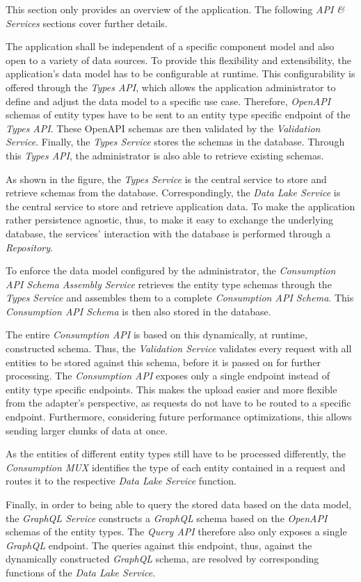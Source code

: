 This section only provides an overview of the application. The following \emph{API \& Services} sections cover further details.\par
The application shall be independent of a specific component model and also open to a variety of data sources. To provide this flexibility and extensibility, the application's data model has to be configurable at runtime. This configurability is offered through the \emph{Types API}, which allows the application administrator to define and adjust the data model to a specific use case. Therefore, \emph{OpenAPI} schemas of entity types have to be sent to an entity type specific endpoint of the \emph{Types API}. These OpenAPI schemas are then validated by the \emph{Validation Service}. Finally, the \emph{Types Service} stores the schemas in the database. Through this \emph{Types API}, the administrator is also able to retrieve existing schemas.\par
As shown in the figure, the \emph{Types Service} is the central service to store and retrieve schemas from the database. Correspondingly, the \emph{Data Lake Service} is the central service to store and retrieve application data. To make the application rather persistence agnostic, thus, to make it easy to exchange the underlying database, the services' interaction with the database is performed through a \emph{Repository}.\par 
To enforce the data model configured by the administrator, the \emph{Consumption API Schema Assembly Service} retrieves the entity type schemas through the \emph{Types Service} and assembles them to a complete \emph{Consumption API Schema}. This \emph{Consumption API Schema} is then also stored in the database.\par
The entire \emph{Consumption API} is based on this dynamically, at runtime, constructed schema. Thus, the \emph{Validation Service} validates every request with all entities to be stored against this schema, before it is passed on for further processing. The \emph{Consumption API} exposes only a single endpoint instead of entity type specific endpoints. This makes the upload easier and more flexible from the adapter's perspective, as requests do not have to be routed to a specific endpoint. Furthermore, considering future performance optimizations, this allows sending larger chunks of data at once.\par
As the entities of different entity types still have to be processed differently, the \emph{Consumption MUX} identifies the type of each entity contained in a request and routes it to the respective \emph{Data Lake Service} function.\par 
Finally, in order to being able to query the stored data based on the data model, the \emph{GraphQL Service} constructs a \emph{GraphQL} schema based on the \emph{OpenAPI} schemas of the entity types. The \emph{Query API} therefore also only exposes a single \emph{GraphQL} endpoint. The queries against this endpoint, thus, against the dynamically constructed \emph{GraphQL} schema, are resolved by corresponding functions of the \emph{Data Lake Service}.\\

